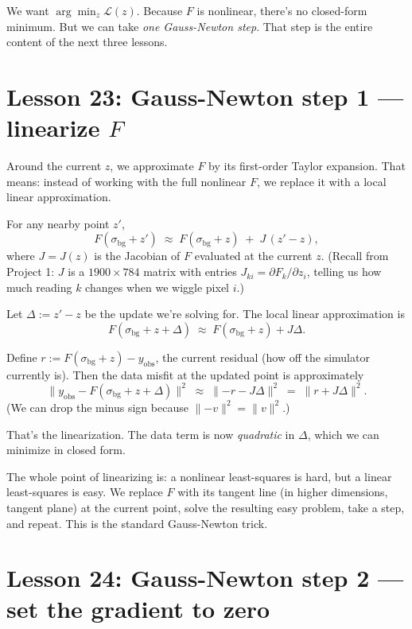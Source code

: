 \documentclass[11pt]{article}
\newcommand{\norm}[1]{\lVert #1 \rVert}
\begin{document}
We want $\arg\min_z \mathcal{L}(z)$. Because $F$ is nonlinear, there's
no closed-form minimum. But we can take \emph{one Gauss-Newton step}.
That step is the entire content of the next three lessons.

\section{Lesson 23: Gauss-Newton step 1 --- linearize $F$}

Around the current $z$, we approximate $F$ by its first-order Taylor
expansion. That means: instead of working with the full nonlinear $F$,
we replace it with a local linear approximation.

For any nearby point $z'$,
\[
F(\sigma_{\text{bg}} + z') \;\approx\; F(\sigma_{\text{bg}} + z) \;+\; J\,(z' - z),
\]
where $J = J(z)$ is the Jacobian of $F$ evaluated at the current $z$.
(Recall from Project 1: $J$ is a $1900 \times 784$ matrix with entries
$J_{ki} = \partial F_k / \partial z_i$, telling us how much reading $k$
changes when we wiggle pixel $i$.)

Let $\Delta := z' - z$ be the update we're solving for. The local
linear approximation is
\[
F(\sigma_{\text{bg}} + z + \Delta) \;\approx\; F(\sigma_{\text{bg}} + z) + J \Delta.
\]

Define $r := F(\sigma_{\text{bg}} + z) - y_{\text{obs}}$, the current
residual (how off the simulator currently is). Then the data misfit at
the updated point is approximately
\[
\norm{y_{\text{obs}} - F(\sigma_{\text{bg}} + z + \Delta)}^2
\;\approx\;
\norm{-r - J \Delta}^2
\;=\;
\norm{r + J \Delta}^2.
\]
(We can drop the minus sign because $\norm{-v}^2 = \norm{v}^2$.)

That's the linearization. The data term is now \emph{quadratic} in
$\Delta$, which we can minimize in closed form.

\begin{intuition}
The whole point of linearizing is: a nonlinear least-squares is hard,
but a linear least-squares is easy. We replace $F$ with its tangent
line (in higher dimensions, tangent plane) at the current point, solve
the resulting easy problem, take a step, and repeat. This is the
standard Gauss-Newton trick.
\end{intuition}

\section{Lesson 24: Gauss-Newton step 2 --- set the gradient to zero}
\end{document}
